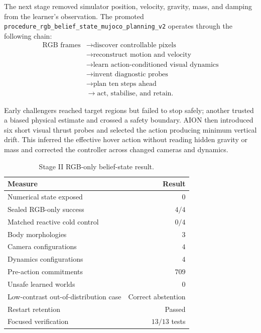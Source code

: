 The next stage removed simulator position, velocity, gravity, mass, and damping
from the learner's observation.  The promoted
\texttt{procedure\_rgb\_belief\_state\_mujoco\_planning\_v2} operates through
the following chain:
\begin{equation}
\label{eq:rgb-belief-chain}
\begin{aligned}
\text{RGB frames}
&\rightarrow \text{discover controllable pixels}\nonumber\\
&\rightarrow \text{reconstruct motion and velocity}\nonumber\\
&\rightarrow \text{learn action-conditioned visual dynamics}\nonumber\\
&\rightarrow \text{invent diagnostic probes}\nonumber\\
&\rightarrow \text{plan ten steps ahead}\nonumber\\
&\rightarrow \text{act, stabilise, and retain}.
\end{aligned}
\end{equation}

Early challengers reached target regions but failed to stop safely; another
trusted a biased physical estimate and crossed a safety boundary.  AION then
introduced six short visual thrust probes and selected the action producing
minimum vertical drift.  This inferred the effective hover action without
reading hidden gravity or mass and corrected the controller across changed
cameras and dynamics.

\begin{table}[htbp]
\centering
\caption{Stage II RGB-only belief-state result.}
\label{tab:rgb-belief-result}
\begin{tabular}{@{}lr@{}}
\toprule
\textbf{Measure} & \textbf{Result} \\
\midrule
Numerical state exposed & $0$ \\
Sealed RGB-only success & $4/4$ \\
Matched reactive cold control & $0/4$ \\
Body morphologies & $3$ \\
Camera configurations & $4$ \\
Dynamics configurations & $4$ \\
Pre-action commitments & $709$ \\
Unsafe learned worlds & $0$ \\
Low-contrast out-of-distribution case & Correct abstention \\
Restart retention & Passed \\
Focused verification & $13/13$ tests \\
\bottomrule
\end{tabular}
\end{table}

